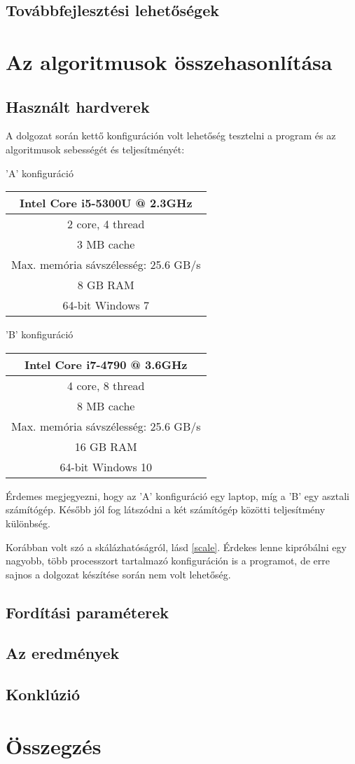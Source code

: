 \documentclass[twoside, a4paper, 12pt]{article}
\begin{document}
\subsection{Továbbfejlesztési lehetőségek}

\clearpage
\section{Az algoritmusok összehasonlítása}

\subsection{Használt hardverek}

A dolgozat során kettő konfiguráción volt lehetőség tesztelni a program és az algoritmusok sebességét és teljesítményét: \bigskip \bigskip \bigskip

'A' konfiguráció ~~~~~~~~
\begin{tabular}{ | c | }
  \hline
  Intel Core i5-5300U @ 2.3GHz \\ \hline
  2 core, 4 thread \\ \hline
  3 MB cache \\ \hline
  Max. memória sávszélesség: 25.6 GB/s \\ \hline
  8 GB RAM\\ \hline
  64-bit Windows 7 \\
  \hline
\end{tabular}

\bigskip \bigskip

'B' konfiguráció ~~~~~~~~
\begin{tabular}{ | c | }
  \hline
  Intel Core i7-4790 @ 3.6GHz \\ \hline
  4 core, 8 thread \\ \hline
  8 MB cache \\ \hline
  Max. memória sávszélesség: 25.6 GB/s \\ \hline
  16 GB RAM\\ \hline
  64-bit Windows 10 \\
  \hline
\end{tabular}

\bigskip \bigskip

Érdemes megjegyezni, hogy az 'A' konfiguráció egy laptop, míg a 'B' egy asztali számítógép. Később jól fog látszódni a két számítógép közötti teljesítmény különbség. \par
Korábban volt szó a skálázhatóságról, lásd \ref{scale}. Érdekes lenne kipróbálni egy nagyobb, több processzort tartalmazó konfiguráción is a programot, de erre sajnos a dolgozat készítése során nem volt lehetőség.

\subsection{Fordítási paraméterek} \label{optpar}

\subsection{Az eredmények} \label{benchmark}

\subsection{Konklúzió}

\clearpage
\section{Összegzés}
\end{document}
